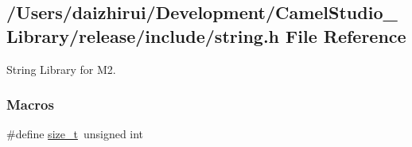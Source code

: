 \hypertarget{a00038}{}\subsection{/\+Users/daizhirui/\+Development/\+Camel\+Studio\+\_\+\+Library/release/include/string.h File Reference}
\label{a00038}


String Library for M2.  


\subsubsection*{Macros}
\begin{DoxyCompactItemize}
\item 
\#define \mbox{\hyperlink{a00038_a43b4547e12226fef871eed8afe191ad7}{size\+\_\+t}}~unsigned int
\end{DoxyCompactItemize}
